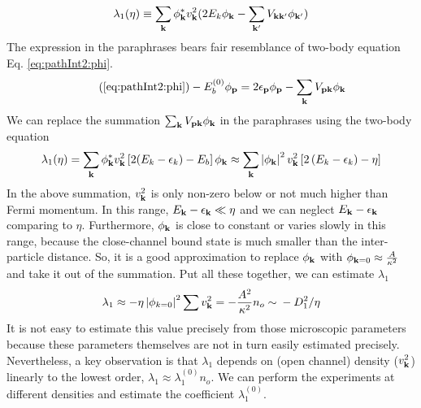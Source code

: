 \begin{equation*}
\lambda_{1}(\eta)\equiv\sum_{\mathbf{k}}{\phi_{\mathbf{k}}^{*}}v_{\mathbf{k}}^{2}(2E_{k}\phi_{\mathbf{k}}-\sum_{\mathbf{k}'}V_{\mathbf{k}\mathbf{k}'}\phi_{\mathbf{k}'})
\end{equation*}
The expression in the paraphrases bears fair resemblance of two-body \sch equation Eq. \ref{eq:pathInt2:phi}.  
\begin{equation}\tag{\ref{eq:pathInt2:phi}}
-E_{b}^{(0)}\phi_{\vp}=2\epsilon_{\vp}\phi_{\vp}-\sum_{\vk}V_{\vp\vk} \phi_{\vk}
\end{equation}
We can replace the summation $\sum_{\mathbf{k}}V_{\mathbf{p}\mathbf{k}} \phi_{\mathbf{k}}$ in the paraphrases using the two-body \sch equation
\begin{equation*}
\lambda_{1}(\eta)=\sum_{\mathbf{k}}{\phi_{\mathbf{k}}^{*}}v_{\mathbf{k}}^{2}\left[2(E_{k}-\epsilon_{k})-E_b\right]\phi_{\mathbf{k}}
	\approx\sum_{\mathbf{k}}\left\lvert{\phi_{\ensuremath{\mathbf{k}}}}\right\rvert^2v_{\mathbf{k}}^{2}\left[2\left(E_{k}-\epsilon_{k}\right)-\eta\right]
\end{equation*}
In the above summation, $v_{\mathbf{k}}^2$ is only non-zero below or not much higher than Fermi momentum.  In this range, $E_{\mathbf{k}}-\epsilon_{\mathbf{k}}\ll\eta$ and we can neglect $E_{\mathbf{k}}-\epsilon_{\mathbf{k}}$ comparing to $\eta$.  
Furthermore, $\phi_{\mathbf{k}}$ is close to constant or varies slowly in this range, because the close-channel bound state is much smaller than the inter-particle distance.    So, it is a good approximation to replace $\phi_{\mathbf{k}}$ with $\phi_{\mathbf{k}=0}\approx\frac{A}{\kappa^{2}}$ and take it out of the summation.  
Put all these together, we can estimate $\lambda_{1}$ 
\begin{equation}
\lambda_{1}\approx-\eta\left\lvert{\phi_{k=0}}\right\rvert^2\sum{}v_{\mathbf{k}}^{2}
	=-\frac{A^{2}}{\kappa^{2}}n_{o}\sim{}-D_{1}^{2}/\eta
\end{equation}
It is not easy to estimate this value precisely from those microscopic parameters because these parameters themselves are not in turn easily estimated precisely.  Nevertheless, a key observation is that $\lambda_1$ depends on (open channel) density ($v_{\mathbf{k}}^2$) linearly to the lowest order, $\lambda_1\approx\lambda_1^{(0)}n_{o}$.  We can perform the experiments at different densities and estimate the coefficient $\lambda_1^{(0)}$. 


